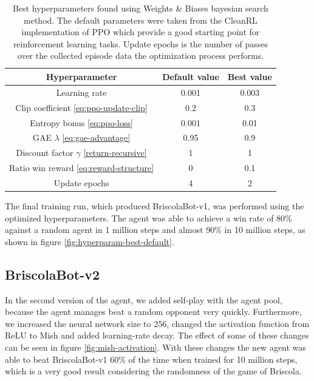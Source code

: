 \begin{table}[H]
    \centering
    \begin{tabular}{ccc}
        \hline
        Hyperparameter & Default value & Best value \\
        \hline
        Learning rate & 0.001 & 0.003 \\
        Clip coefficient \eqref{eq:ppo-update-clip} & 0.2 & 0.3\\
        Entropy bonus \eqref{eq:ppo-loss} & 0.001 & 0.01 \\
        GAE $\lambda$ \eqref{eq:gae-advantage} & 0.95 & 0.9 \\
        Discount factor $\gamma$ \eqref{return-recursive} & 1 & 1 \\
        Ratio win reward \eqref{eq:reward-structure} & 0 & 0.1 \\
        Update epochs & 4 & 2 \\
    \end{tabular}
    \caption{Best hyperparameters found using Weights \& Biases bayesian search method. The default parameters were taken from the CleanRL implementation of PPO \cite{huang2022cleanrl} which provide a good starting point for reinforcement learning tasks. Update epochs is the number of passes over the collected episode data the optimization process performs.}
    \label{tab:hyperparam-best}
\end{table}

The final training run, which produced BriscolaBot-v1, was performed using the optimized hyperparameters. The agent was able to achieve a win rate of 80\% against a random agent in 1 million steps and almost 90\% in 10 million steps, as shown in figure \ref{fig:hyperparam-best-default}.

\subsection{BriscolaBot-v2}
In the second version of the agent, we added self-play with the agent pool, because the agent manages beat a random opponent very quickly. Furthermore, we increased the neural network size to 256, changed the activation function from ReLU to Mish \cite{misra2019mish} and added learning-rate decay. The effect of some of these changes can be seen in figure \ref{fig:mish-activation}. With these changes the new agent was able to beat BriscolaBot-v1 60\% of the time when trained for 10 million steps, which is a very good result considering the randomness of the game of Briscola.

